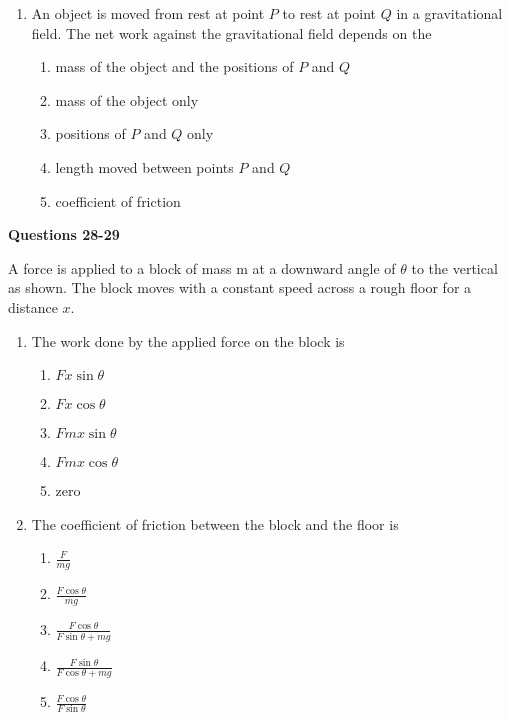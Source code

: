 \documentclass{../../oss-apphys}
\begin{document}
\begin{multicols}{2}
\begin{enumerate}[resume,leftmargin=18pt]
  \item An object is moved from rest at point $P$ to rest at point $Q$ in a
    gravitational field. The net work against the gravitational field depends
    on the
    \begin{enumerate}[noitemsep,topsep=0pt,leftmargin=18pt,label=(\Alph*)]
    \item mass of the object and the positions of $P$ and $Q$
    \item mass of the object only
    \item positions of $P$ and $Q$ only
    \item length moved between points $P$ and $Q$
    \item coefficient of friction
    \end{enumerate}
  \end{enumerate}
  \columnbreak
  
  \textbf{Questions 28-29}

  A force is applied to a block of mass m at a downward angle of $\theta$ to
  the vertical as shown. The block moves with a constant speed across a rough
  floor for a distance $x$.

  \begin{enumerate}[resume,leftmargin=18pt]
  \item The work done by the applied force on the block is
    \begin{enumerate}[noitemsep,topsep=0pt,leftmargin=18pt,label=(\Alph*)]
    \item $Fx\sin\theta$
    \item $Fx\cos\theta$
    \item $Fmx\sin\theta$
    \item $Fmx\cos\theta$
    \item zero
    \end{enumerate}
    
  \item The coefficient of friction between the block and the floor is
    \begin{enumerate}[noitemsep,topsep=0pt,leftmargin=18pt,label=(\Alph*)]
    \item $\displaystyle\frac{F}{mg}$
    \item $\displaystyle\frac{F\cos\theta}{mg}$
    \item $\displaystyle\frac{F\cos\theta}{F\sin\theta+mg}$
    \item $\displaystyle\frac{F\sin\theta}{F\cos\theta+mg}$
    \item $\displaystyle\frac{F\cos\theta}{F\sin\theta}$
    \end{enumerate}


\end{enumerate}
\end{multicols}
\end{document}
